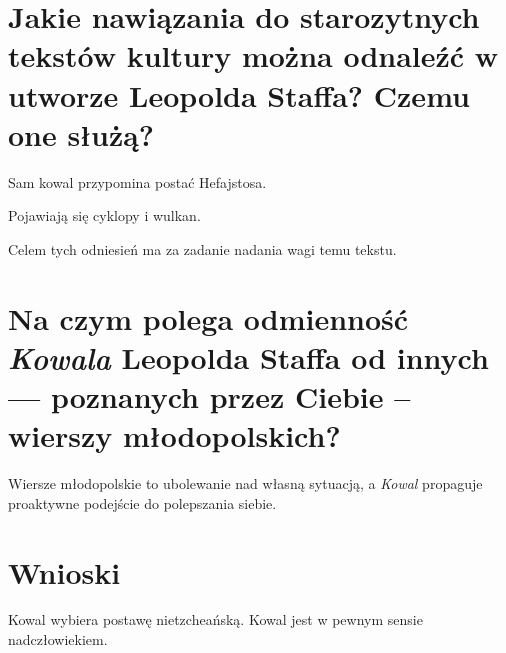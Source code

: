 \documentclass{article}
\begin{document}
\section{Jakie nawiązania do starozytnych tekstów kultury można odnaleźć w utworze Leopolda Staffa? Czemu one służą?}
Sam kowal przypomina postać Hefajstosa.

Pojawiają się cyklopy i wulkan.

Celem tych odniesień ma za zadanie nadania wagi temu tekstu.
\section{Na czym polega odmienność \emph{Kowala} Leopolda Staffa od innych --- poznanych przez Ciebie -- wierszy młodopolskich?}
Wiersze młodopolskie to ubolewanie nad własną sytuacją, a \emph{Kowal} propaguje proaktywne podejście do polepszania siebie.
\section{Wnioski}
Kowal wybiera postawę nietzcheańską. Kowal jest w pewnym sensie nadczłowiekiem.
\end{document}
